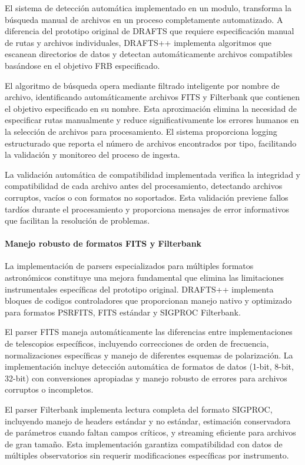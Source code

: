 El sistema de detección automática implementado en un modulo, transforma la búsqueda manual de archivos en un proceso completamente automatizado. A diferencia del prototipo original de DRAFTS que requiere especificación manual de rutas y archivos individuales, DRAFTS++ implementa algoritmos que escanean directorios de datos y detectan automáticamente archivos compatibles basándose en el objetivo FRB especificado.

El algoritmo de búsqueda opera mediante filtrado inteligente por nombre de archivo, identificando automáticamente archivos FITS y Filterbank que contienen el objetivo especificado en su nombre. Esta aproximación elimina la necesidad de especificar rutas manualmente y reduce significativamente los errores humanos en la selección de archivos para procesamiento. El sistema proporciona logging estructurado que reporta el número de archivos encontrados por tipo, facilitando la validación y monitoreo del proceso de ingesta.

La validación automática de compatibilidad implementada verifica la integridad y compatibilidad de cada archivo antes del procesamiento, detectando archivos corruptos, vacíos o con formatos no soportados. Esta validación previene fallos tardíos durante el procesamiento y proporciona mensajes de error informativos que facilitan la resolución de problemas.

\paragraph{Manejo robusto de formatos FITS y Filterbank}

La implementación de parsers especializados para múltiples formatos astronómicos constituye una mejora fundamental que elimina las limitaciones instrumentales específicas del prototipo original. DRAFTS++ implementa bloques de codigos controladores que proporcionan manejo nativo y optimizado para formatos PSRFITS, FITS estándar y SIGPROC Filterbank.

El parser FITS maneja automáticamente las diferencias entre implementaciones de telescopios específicos, incluyendo correcciones de orden de frecuencia, normalizaciones específicas y manejo de diferentes esquemas de polarización. La implementación incluye detección automática de formatos de datos (1-bit, 8-bit, 32-bit) con conversiones apropiadas y manejo robusto de errores para archivos corruptos o incompletos.

El parser Filterbank implementa lectura completa del formato SIGPROC, incluyendo manejo de headers estándar y no estándar, estimación conservadora de parámetros cuando faltan campos críticos, y streaming eficiente para archivos de gran tamaño. Esta implementación garantiza compatibilidad con datos de múltiples observatorios sin requerir modificaciones específicas por instrumento.

